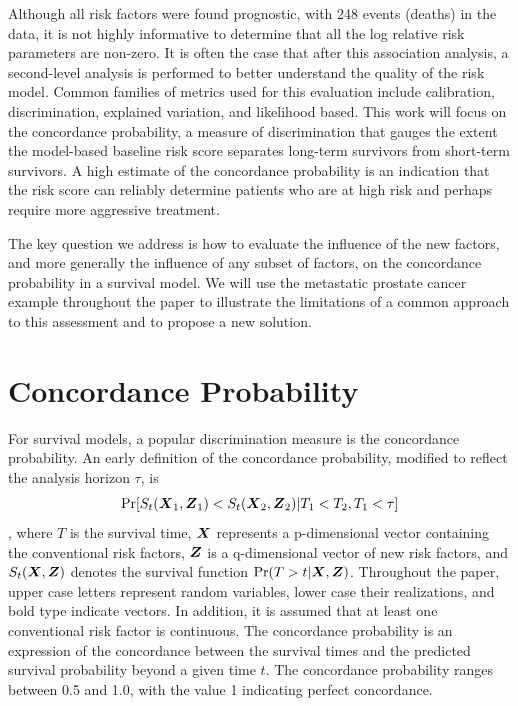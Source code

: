 \documentclass[12pt]{article}
\newcommand{\bmX}{\mbox{\boldmath $X$}}
\newcommand{\bmZ}{\mbox{\boldmath $Z$}}
\begin{document}
Although all risk factors were found prognostic, with 248 events (deaths) in the data, it is not highly informative to determine that all the log relative risk parameters are non-zero. It is often the case that after this association analysis, a second-level analysis is performed to better understand the quality of the risk model. Common families of metrics used for this evaluation include calibration, discrimination, explained variation, and likelihood based. This work will focus on the concordance probability, a measure of discrimination that gauges the extent the model-based baseline risk score separates long-term survivors from short-term survivors.  A high estimate of the concordance probability is an indication that the risk score can reliably determine patients who are at high risk and perhaps require more aggressive treatment. 

The key question we address is how to evaluate the influence of the new factors, and more generally the influence of any subset of factors, on the concordance probability in a survival model. We will use the metastatic prostate cancer example throughout the paper to illustrate the limitations of a common approach to this assessment and to propose a new solution. 



\vskip 0.50in

\section{Concordance Probability} 

For survival models, a popular discrimination measure is the concordance probability. An early definition of the concordance probability, modified to reflect the analysis horizon $\tau$, is 
\[ \mbox{Pr}[S_t(\bmX_1, \bmZ_1) <  S_t( \bmX_2, \bmZ_2)  | T_1 < T_2, T_1 < \tau]  \]
\citep{Pencina2004}, where $T$ is the survival time, $\bmX$ represents a p-dimensional vector containing the conventional risk factors, $\bmZ$ is a q-dimensional vector of new risk factors, and $S_t(\bmX, \bmZ)$ denotes the survival function $\mbox{Pr}(T > t | \bmX, \bmZ)$. Throughout the paper, upper case letters represent random variables, lower case their realizations, and bold type indicate vectors. In addition, it is assumed that at least one conventional risk factor is continuous. The concordance probability is an expression of the concordance between the survival times and the predicted survival probability beyond a given time $t$. The concordance probability ranges between 0.5 and 1.0, with the value 1 indicating perfect concordance.
\end{document}
